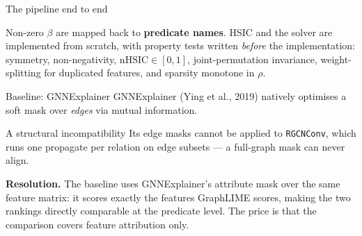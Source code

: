 \documentclass[10pt,aspectratio=169]{beamer}
\newcommand{\Xmat}{\mathbf{X}}
\begin{document}
\begin{frame}{The pipeline end to end}
  \centering

  \vfill
  \raggedright
  \footnotesize
  Non-zero $\beta$ are mapped back to \textbf{predicate names}. HSIC and the
  solver are implemented from scratch, with property tests written
  \emph{before} the implementation: symmetry, non-negativity,
  $\mathrm{nHSIC} \in [0,1]$, joint-permutation invariance, weight-splitting
  for duplicated features, and sparsity monotone in $\rho$.
\end{frame}

\begin{frame}{Baseline: GNNExplainer}
  GNNExplainer (Ying et al., 2019) natively optimises a soft mask over
  \emph{edges} via mutual information.

  \vfill
  \begin{block}{A structural incompatibility}
    Its edge masks cannot be applied to \texttt{RGCNConv}, which runs one
    propagate per relation on edge subsets --- a full-graph mask can never
    align.
  \end{block}

  \vfill
  \textbf{Resolution.} The baseline uses GNNExplainer's \alert{attribute
  mask} over the same feature matrix: it scores exactly the features
  GraphLIME scores, making the two rankings directly comparable at the
  predicate level. The price is that the comparison covers feature
  attribution only.
\end{frame}
\end{document}
